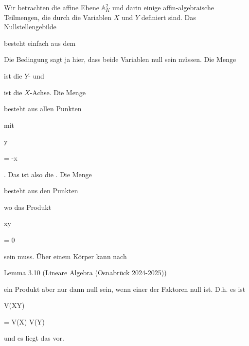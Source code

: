 

{


Wir betrachten die affine Ebene ${\mathbb A}^{2}_{ K }$ und darin einige affin-algebraische Teilmengen, die durch die Variablen $X$ und $Y$ definiert sind. Das Nullstellengebilde


 besteht einfach aus dem  {}


 Die Bedingung sagt ja hier, dass beide Variablen null sein müssen. Die Menge


 ist die $Y$- {}
 {} {}
und


 ist die $X$-Achse. Die Menge


 besteht aus allen Punkten


 mit


\mavergleichskette


{\vergleichskette


{ y
}


{ = }{ -x
}


{  }{
}


{    }{
}


{   }{
}


}
{}{}{.}
Das ist also die  {.} Die Menge


 besteht aus den Punkten


 wo das Produkt


\mavergleichskette


{\vergleichskette


{ xy
}


{ = }{ 0
}


{  }{
}


{    }{
}


{   }{
}


}
{}{}{}
sein muss. Über einem Körper kann nach

Lemma 3.10 (Lineare Algebra (Osnabrück 2024-2025))

ein Produkt aber nur dann null sein, wenn einer der Faktoren null ist. D.h. es ist


\mavergleichskette


{\vergleichskette


{ V(XY)
}


{ = }{ V(X) \cup V(Y)
}


{  }{
}


{    }{
}


{   }{
}


}
{}{}{}
und es liegt das  {} vor.


}


